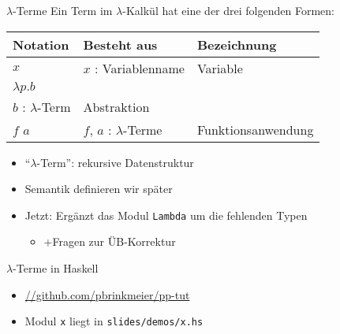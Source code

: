 \documentclass{beamer}
\newcommand{\code}[1]{
	\begin{mdframed}
		
	\end{mdframed}
}
\begin{document}
\begin{frame}{$\lambda$-Terme}
	Ein Term im $\lambda$-Kalkül hat eine der drei folgenden Formen:

	\vspace{0.5cm}

	\begin{tabularx}{\textwidth}{ X | X | X }
		\textbf{Notation} & \textbf{Besteht aus}                      & \textbf{Bezeichnung} \\
		\hline
		$x$               & $x$ : Variablenname                       & Variable             \\
		\hline
		$\lambda{}p.b$    &
			\begin{tabular}[t]{@{}c@{}}$p$ : Variablenname\\$b$ : $\lambda$-Term\end{tabular}
									      & Abstraktion          \\
		\hline
		$f$ $a$           & $f$, $a$ : $\lambda$-Terme                & Funktionsanwendung   \\
	\end{tabularx}

	\vspace{0.5cm}

	\begin{itemize}
		\item \enquote{$\lambda$-Term}: rekursive Datenstruktur
		\item Semantik definieren wir später
		\pause
		\item Jetzt: Ergänzt das Modul \texttt{Lambda} um die fehlenden Typen
		\begin{itemize}
			\item +Fragen zur ÜB-Korrektur
		\end{itemize}
	\end{itemize}
\end{frame}

\begin{frame}{$\lambda$-Terme in Haskell}
	\code{demos/Lambda.hs}

	\begin{itemize}
		\item \url{//github.com/pbrinkmeier/pp-tut}
		\item Modul \texttt{x} liegt in \texttt{slides/demos/x.hs}
	\end{itemize}
\end{frame}
\end{document}
